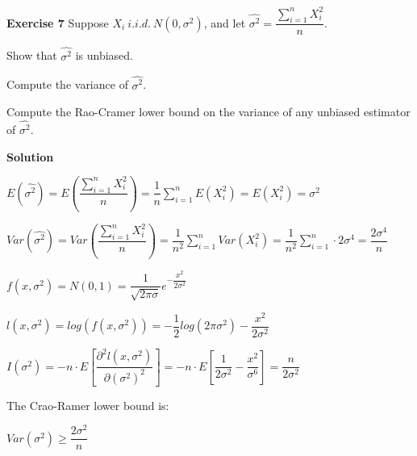 \documentclass[12pt]{article}
\begin{document}
\textbf{Exercise 7} Suppose $X_i ~ i.i.d.\ N\left(0, \sigma^2\right)$, and let $\hat{\sigma^2}=\dfrac{\sum_{i=1}^n X_i^2}{n}$.
\begin{list}{()~}{}
\item Show that $\hat{\sigma^2}$ is unbiased.
\item Compute the variance of $\hat{\sigma^2}$.
\item Compute the Rao-Cramer lower bound on the variance of any unbiased estimator of $\hat{\sigma^2}$.
\end{list}

\medskip

\textbf{Solution}

\begin{list}{()~}{}
\item $E\left(\hat{\sigma^2}\right)=E\left(\dfrac{\sum_{i=1}^n X_i^2}{n}\right)=\dfrac{1}{n}\sum_{i=1}^n E\left(X_i^2\right)=E\left(X_i^2\right)=\sigma^2$
\item $Var\left(\hat{\sigma^2}\right)=Var\left(\dfrac{\sum_{i=1}^n X_i^2}{n}\right)=\dfrac{1}{n^2}\sum_{i=1}^n Var\left(X_i^2\right)=\dfrac{1}{n^2}\sum_{i=1}^n\cdot 2\sigma^4=\dfrac{2\sigma^4}{n}$
\item
$f\left(x, \sigma^2\right)=N\left(0, 1\right)=\dfrac{1}{\sqrt{2\pi\sigma}}e^{-\dfrac{x^2}{2\sigma^2}}$

$l\left(x, \sigma^2\right)=log\left(f\left(x, \sigma^2\right)\right)=-\dfrac{1}{2}log\left(2\pi\sigma^2\right)-\dfrac{x^2}{2\sigma^2}$

$I\left(\sigma^2\right)=-n\cdot E\left[\dfrac{\partial^2l\left(x, \sigma^2\right)}{\partial\left(\sigma^2\right)^2}\right]=-n\cdot E\left[\dfrac{1}{2\sigma^2}-\dfrac{x^2}{\sigma^6}\right]=\dfrac{n}{2\sigma^2}$

The Crao-Ramer lower bound is:

$Var\left(\sigma^2\right)\geq \dfrac{2\sigma^2}{n}$
\end{list}
\end{document}
